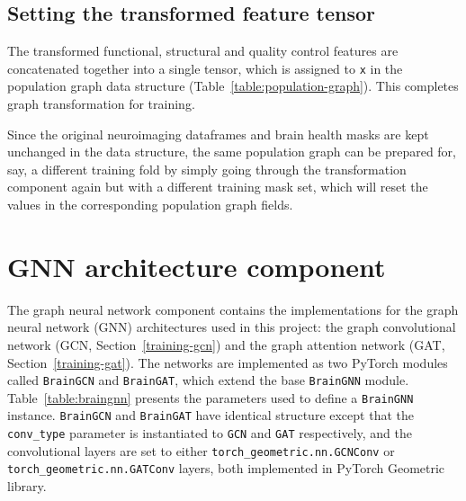 \subsection{Setting the transformed feature tensor}
The transformed functional, structural and quality control features are concatenated together into a single tensor, which is assigned to \texttt{x} in the population graph data structure (Table~\ref{table:population-graph}). This completes graph transformation for training.

Since the original neuroimaging dataframes and brain health masks are kept unchanged in the data structure, the same population graph can be prepared for, say, a different training fold by simply going through the transformation component again but with a different training mask set, which will reset the values in the corresponding population graph fields.

\section{GNN architecture component}

The graph neural network component contains the implementations for the graph neural network (GNN) architectures used in this project: the graph convolutional network (GCN, Section~\ref{training-gcn}) and the graph attention network (GAT, Section~\ref{training-gat}). The networks are implemented as two PyTorch modules called \texttt{BrainGCN} and \texttt{BrainGAT}, which extend the base \texttt{BrainGNN} module. Table~\ref{table:braingnn} presents the parameters used to define a \texttt{BrainGNN} instance. \texttt{BrainGCN} and \texttt{BrainGAT}  have identical structure except that the \texttt{conv\_type} parameter is instantiated to \texttt{GCN} and \texttt{GAT} respectively, and the convolutional layers are set to either \texttt{torch\_geometric.nn.GCNConv} or \texttt{torch\_geometric.nn.GATConv} layers, both implemented in PyTorch Geometric library.


